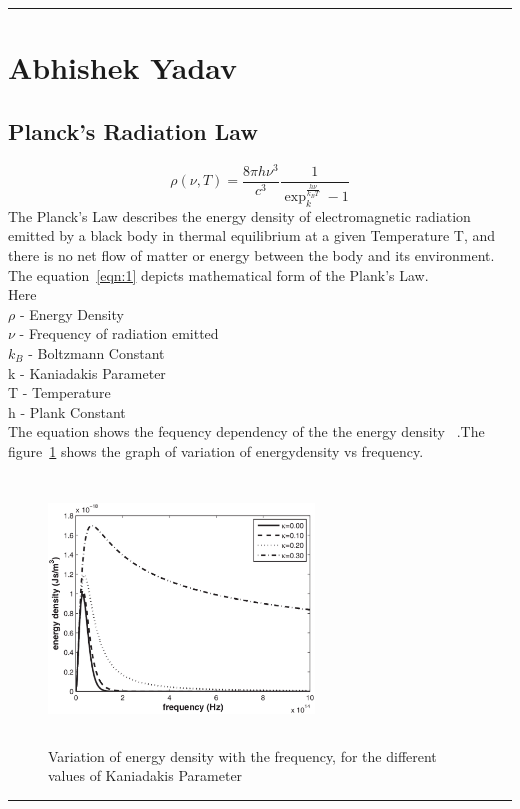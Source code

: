 
\hrule
\section{Abhishek Yadav}
\subsection{Planck's Radiation Law}
\begin{equation}
	\rho(\nu,T)={\frac{8 \pi h \nu^3}{c^3}}  {\frac{1}{\exp_k^{\frac{h \nu}{k_BT}} - 1}}
	\label{eqn:1}
\end{equation}
The Planck's Law describes the energy density of electromagnetic radiation emitted by a black body in thermal equilibrium at a given Temperature T, and there is no net flow of matter or energy between the body and its environment.
The equation~\ref{eqn:1} depicts mathematical form of the Plank's Law. \\
Here \\
$\rho$ - Energy Density \\
$\nu$  - Frequency of radiation emitted \\
$k_B$  -  Boltzmann Constant \\
k      -  Kaniadakis Parameter \\
T      - Temperature \\
h      - Plank Constant \\
The equation shows the fequency dependency of the the energy density ~\cite{meb008}.The figure~\ref{fig:me20b008} shows the graph of variation of energydensity vs frequency.
\begin{figure}[h]
        \begin{center}
		\includegraphics[width=200pt,height=200pt]{me20b008.eps}
		\end{center}
        \caption{Variation of energy density with the frequency, for the different values of Kaniadakis Parameter}
        \label{fig:me20b008}
\end{figure}
\hrule



